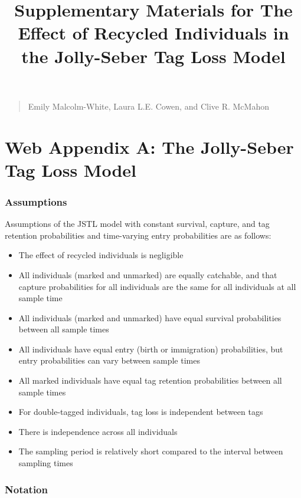 \documentclass[]{article}
\title{Supplementary Materials for The Effect of Recycled Individuals
in the Jolly-Seber Tag Loss Model}
\author{}
\date{}
\providecommand{\tightlist}{%
  \setlength{\itemsep}{0pt}\setlength{\parskip}{0pt}}
\begin{document}
\maketitle

\begin{quote}
\begin{center} {\large Emily Malcolm-White, Laura L.E. Cowen, and Clive R. McMahon} \end{center}
\end{quote}

\section{Web Appendix A: The Jolly-Seber Tag Loss
Model}\label{web-appendix-a-the-jolly-seber-tag-loss-model}

\subsubsection{Assumptions}\label{assumptions}

Assumptions of the JSTL model with constant survival, capture, and tag
retention probabilities and time-varying entry probabilities are as
follows:

\begin{itemize}
\tightlist
\item
  The effect of recycled individuals is negligible
\item
  All individuals (marked and unmarked) are equally catchable, and that
  capture probabilities for all individuals are the same for all
  individuals at all sample time
\item
  All individuals (marked and unmarked) have equal survival
  probabilities between all sample times
\item
  All individuals have equal entry (birth or immigration) probabilities,
  but entry probabilities can vary between sample times
\item
  All marked individuals have equal tag retention probabilities between
  all sample times
\item
  For double-tagged individuals, tag loss is independent between tags
\item
  There is independence across all individuals
\item
  The sampling period is relatively short compared to the interval
  between sampling times
\end{itemize}

\subsubsection{Notation}\label{notation}
\end{document}
